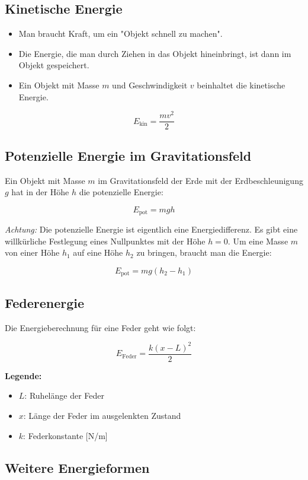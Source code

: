 \documentclass[a4paper, 8pt]{extarticle}
\begin{document}
\begin{landscape}
\begin{multicols*}{3}
\subsection{ Kinetische Energie}

\begin{itemize}
    \item Man braucht Kraft, um ein "Objekt schnell zu machen".
    \item Die Energie, die man durch Ziehen in das Objekt hineinbringt, ist dann im Objekt gespeichert.
    \item Ein Objekt mit Masse \( m \) und Geschwindigkeit \( v \) beinhaltet die kinetische Energie.
\end{itemize}

\[
E_{\text{kin}} = \frac{mv^2}{2}
\]

\subsection{ Potenzielle Energie im Gravitationsfeld}

Ein Objekt mit Masse \( m \) im Gravitationsfeld der Erde mit der Erdbeschleunigung \( g \) hat in der Höhe \( h \) die potenzielle Energie:

\[
E_{\text{pot}} = mgh
\]

\textit{Achtung:} Die potenzielle Energie ist eigentlich eine Energiedifferenz. Es gibt eine willkürliche Festlegung eines Nullpunktes mit der Höhe \( h = 0 \). Um eine Masse \( m \) von einer Höhe \( h_1 \) auf eine Höhe \( h_2 \) zu bringen, braucht man die Energie:

\[
E_{\text{pot}} = mg(h_2 - h_1)
\]

\subsection{ Federenergie}

Die Energieberechnung für eine Feder geht wie folgt:

\[
E_{\text{Feder}} = \frac{k (x - L)^2}{2}
\]

\textbf{Legende:}
\begin{itemize}
    \item \( L \): Ruhelänge der Feder
    \item \( x \): Länge der Feder im ausgelenkten Zustand
    \item \( k \): Federkonstante [N/m]
\end{itemize}

\subsection{ Weitere Energieformen}


\end{multicols*}
\end{landscape}
\end{document}
